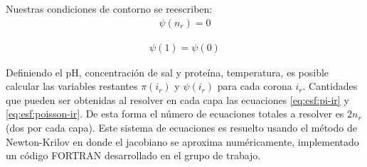 Nuestras condiciones de contorno se reescriben:
\begin{align}
	\psi(n_r) = 0
\end{align}

\begin{align}
\psi(1) = \psi(0)
\end{align}

Definiendo  el pH, concentraci\'on de sal y prote\'ina, temperatura, es posible calcular las variables restantes  $\pi(i_r)$ y $\psi(i_r)$ para cada corona $i_r$.
Cantidades que pueden ser obtenidas al resolver en cada capa las ecuaciones \ref{eq:esf:pi-ir} y \ref{eq:esf:poisson-ir}.
De esta forma el n\'umero de ecuaciones totales a resolver es $2n_r$ (dos por cada capa). 
Este sistema de ecuaciones es resuelto usando el m\'etodo de Newton-Krilov en donde el jacobiano se aproxima num\'ericamente, implementado un c\'odigo FORTRAN desarrollado en el grupo de trabajo.


